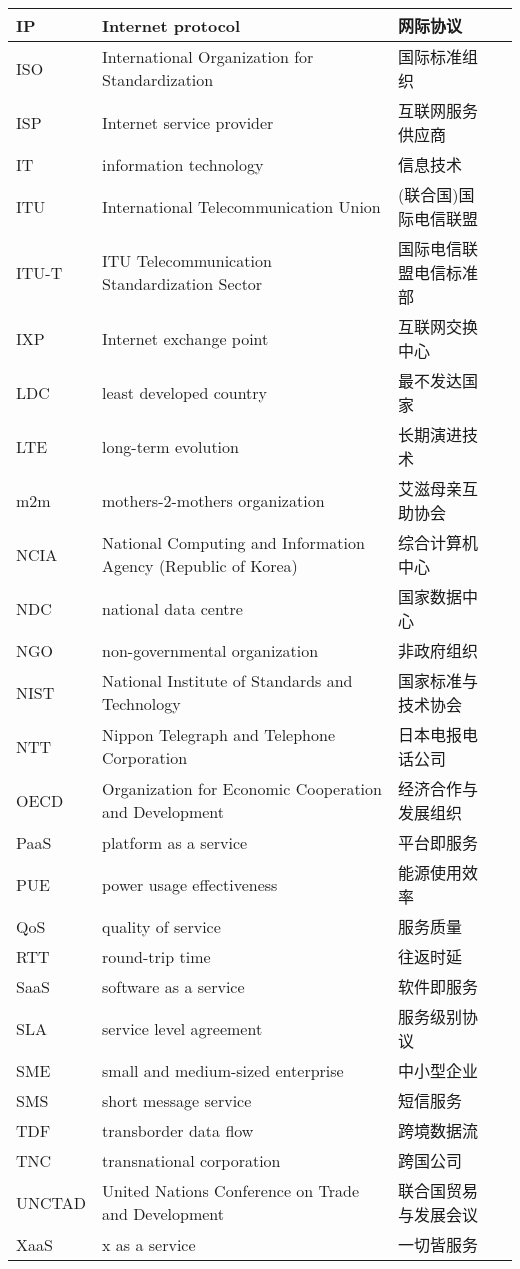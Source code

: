 \documentclass[a4paper, UTF8, 12pt]{article}
\begin{document}
\begin{longtable}{m{2cm}m{3cm}m{3cm}m{4cm}}
    \hline
    IP & Internet protocol & 网际协议 & \\
    \hline
    ISO & International Organization for Standardization & 国际标准组织 & \\
    \hline
    ISP & Internet service provider & 互联网服务供应商 & \\
    \hline
    IT & information technology & 信息技术 & \\
    \hline
    ITU & International Telecommunication Union & (联合国)国际电信联盟 &\\
    \hline
    ITU-T & ITU Telecommunication Standardization Sector & 国际电信联盟电信标准部 & \\
    \hline
    IXP & Internet exchange point & 互联网交换中心 & \\
    \hline
    LDC & least developed country & 最不发达国家 & \\
    \hline
    LTE & long-term evolution & 长期演进技术 & \\
    \hline
    m2m & mothers-2-mothers organization & 艾滋母亲互助协会 & \\
    \hline
    NCIA & National Computing and Information Agency (Republic of Korea) & 综合计算机中心 & \\
    \hline
    NDC & national data centre & 国家数据中心 & \\
    \hline
    NGO & non-governmental organization & 非政府组织 & \\
    \hline
    NIST & National Institute of Standards and Technology & 国家标准与技术协会 & \\
    \hline
    NTT & Nippon Telegraph and Telephone Corporation & 日本电报电话公司 & \\
    \hline
    OECD & Organization for Economic Cooperation and Development & 经济合作与发展组织 & \\
    \hline
    PaaS & platform as a service & 平台即服务 & \\
    \hline
    PUE & power usage effectiveness & 能源使用效率 & \\
    \hline
    QoS & quality of service & 服务质量 & \\
    \hline
    RTT & round-trip time & 往返时延 & \\
    \hline
    SaaS & software as a service & 软件即服务 & \\
    \hline
    SLA & service level agreement & 服务级别协议 & \\ 
    \hline
    SME & small and medium-sized enterprise & 中小型企业 & \\
    \hline
    SMS & short message service & 短信服务 & \\
    \hline
    TDF & transborder data flow & 跨境数据流 & \\ 
    \hline
    TNC & transnational corporation & 跨国公司 & \\
    \hline
    UNCTAD & United Nations Conference on Trade and Development & 联合国贸易与发展会议 & \\
    \hline
    XaaS & x as a service & 一切皆服务 & \\
    \hline
\end{longtable}
\end{document}
